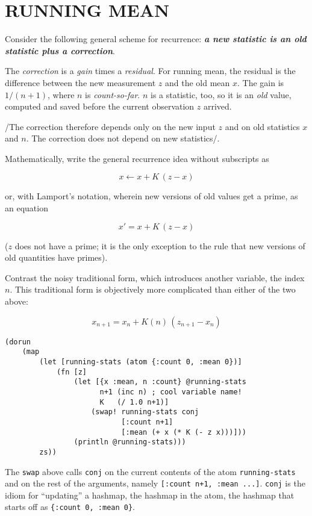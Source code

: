 \documentclass[10pt,oneside,x11names]{article}
\begin{document}
\section{RUNNING MEAN}
\label{running-mean}
Consider the following general scheme for recurrence: \textbf{\emph{a new statistic is an
old statistic plus a correction}}.

The \emph{correction} is a \emph{gain} times a \emph{residual}. For running mean, the
residual is the difference between the new measurement \(z\) and the old
mean \(x\). The gain is \(1/(n+1)\), where \(n\) is \emph{count-so-far}. \(n\) is a
statistic, too, so it is an \emph{old} value, computed and saved before the
current observation \(z\) arrived.

/The correction therefore depends only on the new input \(z\) and on old
statistics \(x\) and \(n\). The correction does not depend on new
statistics/.

Mathematically, write the general recurrence idea without subscripts as

$$x\leftarrow{x+K\,(z-x)}$$

or, with Lamport's notation, wherein new versions of old values get a
prime, as an equation

$$x'=x+K\,(z-x)$$

(\(z\) does not have a prime; it is the only exception to the rule that
new versions of old quantities have primes).

Contrast the noisy traditional form, which introduces another variable,
the index \(n\). This traditional form is objectively more complicated
than either of the two above:

$$x_{n+1}=x_n+K(n)\,(z_{n+1}-x_n)$$

\begin{verbatim}
(dorun
    (map
        (let [running-stats (atom {:count 0, :mean 0})]
            (fn [z]
                (let [{x :mean, n :count} @running-stats
                      n+1 (inc n) ; cool variable name!
                      K   (/ 1.0 n+1)]
                    (swap! running-stats conj
                           [:count n+1]
                           [:mean (+ x (* K (- z x)))]))
                (println @running-stats)))
        zs))
\end{verbatim}

The \texttt{swap} above calls \texttt{conj} on the current contents of the atom
\texttt{running-stats} and on the rest of the arguments, namely
\texttt{[:count n+1, :mean ...]}. \texttt{conj} is the idiom for ``updating'' a hashmap,
the hashmap in the atom, the hashmap that starts off as
\texttt{\{:count 0, :mean 0\}}.
\end{document}
